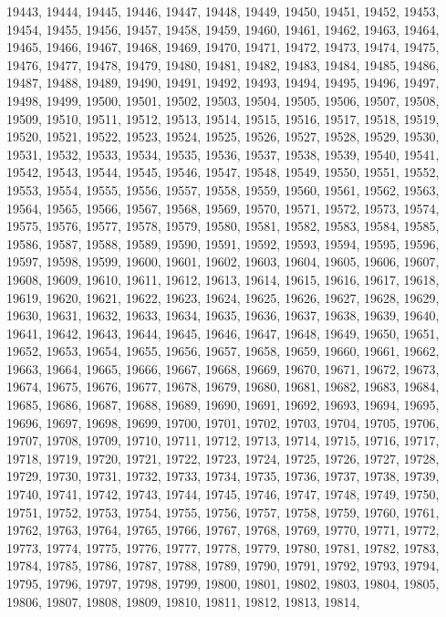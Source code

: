 19443,
19444,
19445,
19446,
19447,
19448,
19449,
19450,
19451,
19452,
19453,
19454,
19455,
19456,
19457,
19458,
19459,
19460,
19461,
19462,
19463,
19464,
19465,
19466,
19467,
19468,
19469,
19470,
19471,
19472,
19473,
19474,
19475,
19476,
19477,
19478,
19479,
19480,
19481,
19482,
19483,
19484,
19485,
19486,
19487,
19488,
19489,
19490,
19491,
19492,
19493,
19494,
19495,
19496,
19497,
19498,
19499,
19500,
19501,
19502,
19503,
19504,
19505,
19506,
19507,
19508,
19509,
19510,
19511,
19512,
19513,
19514,
19515,
19516,
19517,
19518,
19519,
19520,
19521,
19522,
19523,
19524,
19525,
19526,
19527,
19528,
19529,
19530,
19531,
19532,
19533,
19534,
19535,
19536,
19537,
19538,
19539,
19540,
19541,
19542,
19543,
19544,
19545,
19546,
19547,
19548,
19549,
19550,
19551,
19552,
19553,
19554,
19555,
19556,
19557,
19558,
19559,
19560,
19561,
19562,
19563,
19564,
19565,
19566,
19567,
19568,
19569,
19570,
19571,
19572,
19573,
19574,
19575,
19576,
19577,
19578,
19579,
19580,
19581,
19582,
19583,
19584,
19585,
19586,
19587,
19588,
19589,
19590,
19591,
19592,
19593,
19594,
19595,
19596,
19597,
19598,
19599,
19600,
19601,
19602,
19603,
19604,
19605,
19606,
19607,
19608,
19609,
19610,
19611,
19612,
19613,
19614,
19615,
19616,
19617,
19618,
19619,
19620,
19621,
19622,
19623,
19624,
19625,
19626,
19627,
19628,
19629,
19630,
19631,
19632,
19633,
19634,
19635,
19636,
19637,
19638,
19639,
19640,
19641,
19642,
19643,
19644,
19645,
19646,
19647,
19648,
19649,
19650,
19651,
19652,
19653,
19654,
19655,
19656,
19657,
19658,
19659,
19660,
19661,
19662,
19663,
19664,
19665,
19666,
19667,
19668,
19669,
19670,
19671,
19672,
19673,
19674,
19675,
19676,
19677,
19678,
19679,
19680,
19681,
19682,
19683,
19684,
19685,
19686,
19687,
19688,
19689,
19690,
19691,
19692,
19693,
19694,
19695,
19696,
19697,
19698,
19699,
19700,
19701,
19702,
19703,
19704,
19705,
19706,
19707,
19708,
19709,
19710,
19711,
19712,
19713,
19714,
19715,
19716,
19717,
19718,
19719,
19720,
19721,
19722,
19723,
19724,
19725,
19726,
19727,
19728,
19729,
19730,
19731,
19732,
19733,
19734,
19735,
19736,
19737,
19738,
19739,
19740,
19741,
19742,
19743,
19744,
19745,
19746,
19747,
19748,
19749,
19750,
19751,
19752,
19753,
19754,
19755,
19756,
19757,
19758,
19759,
19760,
19761,
19762,
19763,
19764,
19765,
19766,
19767,
19768,
19769,
19770,
19771,
19772,
19773,
19774,
19775,
19776,
19777,
19778,
19779,
19780,
19781,
19782,
19783,
19784,
19785,
19786,
19787,
19788,
19789,
19790,
19791,
19792,
19793,
19794,
19795,
19796,
19797,
19798,
19799,
19800,
19801,
19802,
19803,
19804,
19805,
19806,
19807,
19808,
19809,
19810,
19811,
19812,
19813,
19814,
